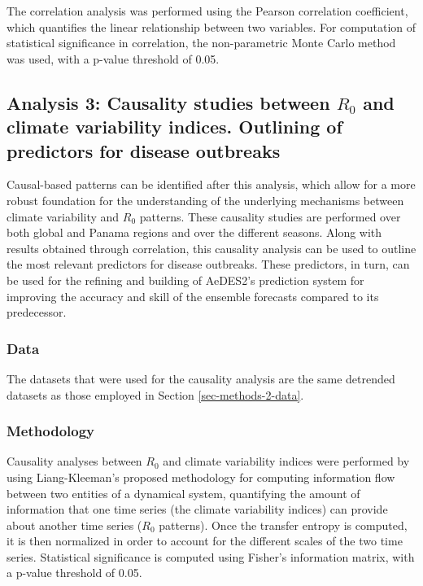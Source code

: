 \documentclass[10pt,twocolumn]{wlscirep}
\begin{document}
The correlation analysis was performed using the Pearson correlation coefficient, which quantifies the linear relationship between two variables. For computation of statistical significance in correlation, the non-parametric Monte Carlo method was used\cite{new_2000}, with a p-value threshold of 0.05.

\subsection{Analysis 3: Causality studies between $R_0$ and climate variability indices. Outlining of predictors for disease outbreaks} \label{sec-methods-3}

Causal-based patterns can be identified after this analysis, which allow for a more robust foundation for the understanding of the underlying mechanisms between climate variability and $R_0$ patterns. These causality studies are performed over both global and Panama regions and over the different seasons. Along with results obtained through correlation, this causality analysis can be used to outline the most relevant predictors for disease outbreaks. These predictors, in turn, can be used for the refining and building of AeDES2's prediction system for improving the accuracy and skill of the ensemble forecasts compared to its predecessor.

\subsubsection{Data} \label{sec-methods-3-data}

The datasets that were used for the causality analysis are the same detrended datasets as those employed in Section \ref{sec-methods-2-data}.

\subsubsection{Methodology} \label{sec-methods-3-methodology}

Causality analyses between $R_0$ and climate variability indices were performed by using Liang-Kleeman's proposed methodology for computing information flow between two entities of a dynamical system, quantifying the amount of information that one time series (the climate variability indices) can provide about another time series ($R_0$ patterns)\cite{liang_2014}. Once the transfer entropy is computed, it is then normalized in order to account for the different scales of the two time series\cite{liang_2015}. Statistical significance is computed using Fisher's information matrix, with a p-value threshold of 0.05.
\end{document}
